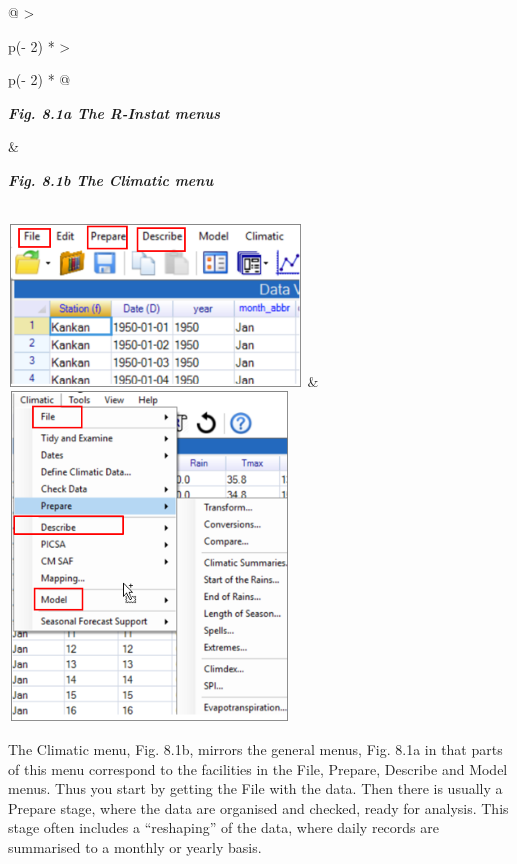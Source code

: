 \documentclass[
  letterpaper,
  DIV=11,
  numbers=noendperiod]{scrreprt}
\begin{document}
\begin{longtable}[]{@{}
  >{\raggedright\arraybackslash}p{(\columnwidth - 2\tabcolsep) * }
  >{\raggedright\arraybackslash}p{(\columnwidth - 2\tabcolsep) * }@{}}
\toprule\noalign{}
\begin{minipage}[b]{\linewidth}\raggedright
\textbf{\emph{Fig. 8.1a The R-Instat menus}}
\end{minipage} & \begin{minipage}[b]{\linewidth}\raggedright
\textbf{\emph{Fig. 8.1b The Climatic menu}}
\end{minipage} \\
\midrule\noalign{}
\endhead
\bottomrule\noalign{}
\endlastfoot
\includegraphics[width=3.07009in,height=1.69384in]{figures/Fig8.1a.png}
&
\includegraphics[width=2.94928in,height=3.43809in]{figures/Fig8.1b.png} \\
\end{longtable}

The Climatic menu, Fig. 8.1b, mirrors the general menus, Fig. 8.1a in
that parts of this menu correspond to the facilities in the File,
Prepare, Describe and Model menus. Thus you start by getting the File
with the data. Then there is usually a Prepare stage, where the data are
organised and checked, ready for analysis. This stage often includes a
``reshaping'' of the data, where daily records are summarised to a
monthly or yearly basis.
\end{document}
